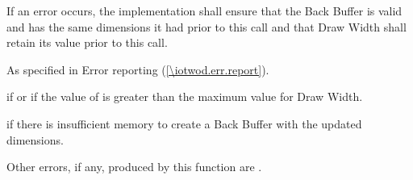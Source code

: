 \begin{itemdescr}
\pnum
If an error occurs, the implementation shall ensure that the Back Buffer is valid and has the same dimensions it had prior to this call and that Draw Width shall retain its value prior to this call.

\pnum
\throws
As specified in Error reporting (\ref{\iotwod.err.report}).

\pnum
\errors
{} if  or if the value of  is greater than the maximum value for Draw Width.

 if there is insufficient memory to create a Back Buffer with the updated dimensions.

Other errors, if any, produced by this function are .
\end{itemdescr}

